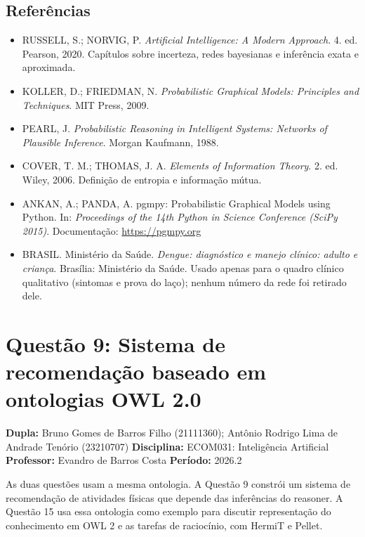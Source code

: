 \documentclass[12pt, a4paper]{article}
\providecommand{\tightlist}{%
  \setlength{\itemsep}{0pt}\setlength{\parskip}{0pt}}
\begin{document}
\subsection{Referências}\label{referuxeancias}

\begin{itemize}
\tightlist
\item
  RUSSELL, S.; NORVIG, P. \emph{Artificial Intelligence: A Modern Approach}. 4. ed. Pearson, 2020. Capítulos sobre incerteza, redes bayesianas e inferência exata e aproximada.
\item
  KOLLER, D.; FRIEDMAN, N. \emph{Probabilistic Graphical Models: Principles and Techniques}. MIT Press, 2009.
\item
  PEARL, J. \emph{Probabilistic Reasoning in Intelligent Systems: Networks of Plausible Inference}. Morgan Kaufmann, 1988.
\item
  COVER, T. M.; THOMAS, J. A. \emph{Elements of Information Theory}. 2. ed. Wiley, 2006. Definição de entropia e informação mútua.
\item
  ANKAN, A.; PANDA, A. pgmpy: Probabilistic Graphical Models using Python. In: \emph{Proceedings of the 14th Python in Science Conference (SciPy 2015)}. Documentação: \url{https://pgmpy.org}
\item
  BRASIL. Ministério da Saúde. \emph{Dengue: diagnóstico e manejo clínico: adulto e criança}. Brasília: Ministério da Saúde. Usado apenas para o quadro clínico qualitativo (sintomas e prova do laço); nenhum número da rede foi retirado dele.
\end{itemize}

\section{Questão 9: Sistema de recomendação baseado em ontologias OWL 2.0}
\label{sec:q9}

\textbf{Dupla:} Bruno Gomes de Barros Filho (21111360); Antônio Rodrigo Lima de Andrade Tenório (23210707) \textbf{Disciplina:} ECOM031: Inteligência Artificial \textbf{Professor:} Evandro de Barros Costa \textbf{Período:} 2026.2

As duas questões usam a mesma ontologia. A Questão 9 constrói um sistema de recomendação de atividades físicas que depende das inferências do reasoner. A Questão 15 usa essa ontologia como exemplo para discutir representação do conhecimento em OWL 2 e as tarefas de raciocínio, com HermiT e Pellet.
\end{document}

